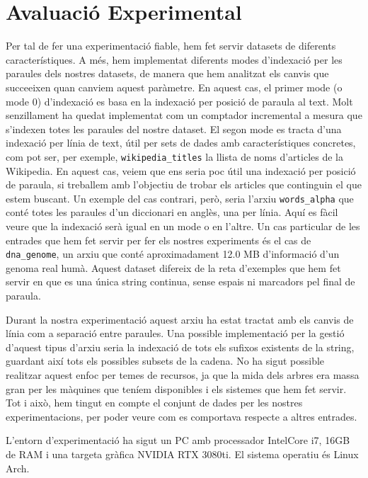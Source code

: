 \section{Avaluació Experimental}

Per tal de fer una experimentació fiable, hem fet servir datasets de diferents característiques. A més, hem implementat diferents modes d'indexació per les paraules dels nostres datasets, de manera que hem analitzat els canvis que succeeixen quan canviem aquest paràmetre. 
En aquest cas, el primer mode (o mode 0) d'indexació es basa en la indexació per posició de paraula al text. Molt senzillament ha quedat implementat com un comptador incremental a mesura que s'indexen totes les paraules del nostre dataset. El segon mode es tracta d'una indexació per línia de text, útil per sets de dades amb característiques concretes, com pot ser, per exemple, \texttt{wikipedia\_titles} la llista de noms d'articles de la Wikipedia. En aquest cas, veiem que ens seria poc útil una indexació per posició de paraula, si treballem amb l'objectiu de trobar els articles que continguin el que estem buscant.
Un exemple del cas contrari, però, seria l'arxiu \texttt{words\_alpha} que conté totes les paraules d'un diccionari en anglès, una per línia. Aquí es fàcil veure que la indexació serà igual en un mode o en l'altre. 
Un cas particular de les entrades que hem fet servir per fer els nostres experiments és el cas de \texttt{dna\_genome}, un arxiu que conté aproximadament 12.0 MB d'informació d'un genoma real humà. Aquest dataset difereix de la reta d'exemples que hem fet servir en que es una única string continua, sense espais ni marcadors pel final de paraula. 

Durant la nostra experimentació aquest arxiu ha estat tractat amb els canvis de línia com a separació entre paraules. Una possible implementació per la gestió d'aquest tipus d'arxiu seria la indexació de tots els sufixos existents de la string, guardant així tots els possibles subsets de la cadena. No ha sigut possible realitzar aquest enfoc per temes de recursos, ja que la mida dels arbres era massa gran per les màquines que teníem disponibles i els sistemes que hem fet servir. Tot i això, hem tingut en compte el conjunt de dades per les nostres experimentacions, per poder veure com es comportava respecte a altres entrades. 

L'entorn d'experimentació ha sigut un PC amb processador IntelCore i7, 16GB de RAM i una targeta gràfica NVIDIA RTX 3080ti. El sistema operatiu és Linux Arch. 

